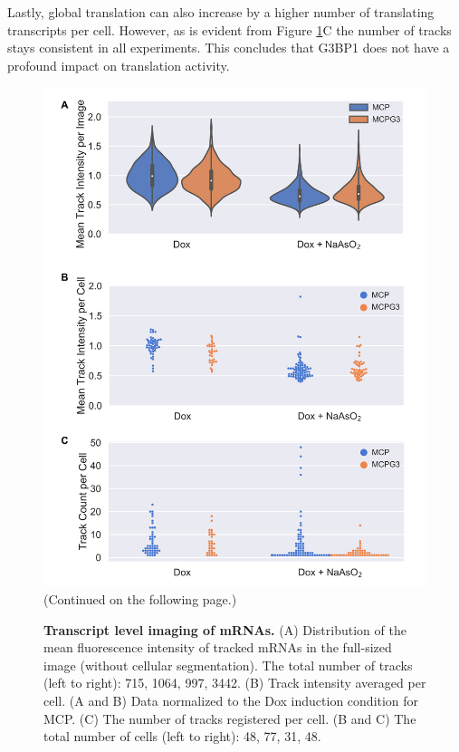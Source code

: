 Lastly, global translation can also increase by a higher number of translating transcripts per cell.
However, as is evident from Figure \ref{fig:mcp_suntag}C the number of tracks stays consistent in all experiments.
This concludes that G3BP1 does not have a profound impact on translation activity.

\begin{figure}[H]
    \centering
    \includegraphics[width=\linewidth]{images/figure4}
    \caption{(Continued on the following page.)}
    \label{fig:mcp_suntag}
    \end{figure}
    \addtocounter{figure}{-1}
    \begin{figure} [t!]
    \caption{\textbf{Transcript level imaging of mRNAs.}
        (A) Distribution of the mean fluorescence intensity of tracked
            mRNAs in the full-sized image (without cellular segmentation).
            The total number of tracks (left to right): 715, 1064, 997, 3442.
        (B) Track intensity averaged per cell.
        (A and B) Data normalized to the Dox induction condition for MCP.
        (C) The number of tracks registered per cell.
        (B and C) The total number of cells (left to right): 48, 77, 31, 48.
    }
\end{figure}

